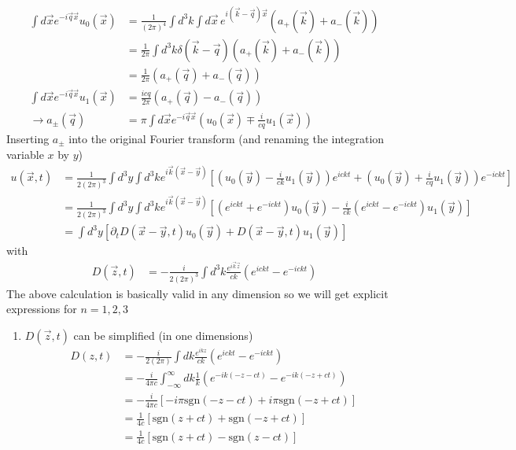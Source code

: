 \documentclass[../main.tex]{subfiles}
\begin{document}
\begin{itemize}
\begin{align}
\int d\vec{x}e^{-i\vec{q}\vec{x}}u_0(\vec{x})&=\frac{1}{(2\pi)^4}\int d^3k\int d\vec{x}\, e^{i(\vec{k}-\vec{q})\vec{x}}\left(a_+(\vec{k})+a_-(\vec{k})\right)\\
&=\frac{1}{2\pi}\int d^3k \delta(\vec{k}-\vec{q})\left(a_+(\vec{k})+a_-(\vec{k})\right)\\
&=\frac{1}{2\pi}\left(a_+(\vec{q})+a_-(\vec{q})\right)\\
\int d\vec{x}e^{-i\vec{q}\vec{x}}u_1(\vec{x})
&=\frac{icq}{2\pi}\left(a_+(\vec{q})-a_-(\vec{q})\right)\\
\rightarrow
a_\pm(\vec{q})&=\pi\int d\vec{x}e^{-i\vec{q}\vec{x}}\left(u_0(\vec{x})\mp\frac{i}{cq}u_1(\vec{x})\right)
\end{align}
Inserting $a_\pm$ into the original Fourier transform (and renaming the integration variable $x$ by $y$)
\begin{align}
u(\vec{x},t)
&=\frac{1}{2(2\pi)^3}\int d^3y\int d^3ke^{i\vec{k}(\vec{x}-\vec{y})} \left[\left(u_0(\vec{y})-\frac{i}{ck}u_1(\vec{y})\right)e^{ickt}+\left(u_0(\vec{y})+\frac{i}{cq}u_1(\vec{y})\right)e^{-ickt}\right]\\
&=\frac{1}{2(2\pi)^3}\int d^3y\int d^3ke^{i\vec{k}(\vec{x}-\vec{y})}\left[\left(e^{ickt}+e^{-ickt}\right) u_0(\vec{y})-\frac{i}{ck}\left(e^{ickt}-e^{-ickt}\right)u_1(\vec{y})\right]\\
&=\int d^3y\left[ \partial_t D(\vec{x}-\vec{y},t)u_0(\vec{y})+D(\vec{x}-\vec{y},t)u_1(\vec{y})\right]
\end{align}
with
\begin{align}
D(\vec{z},t)&=-\frac{i}{2(2\pi)^3}\int d^3k\frac{e^{i\vec{k}\vec{z}}}{ck}(e^{ickt}-e^{-ickt})
\end{align}
The above calculation is basically valid in any dimension so we will get explicit expressions for $n=1,2,3$
\begin{enumerate}
\item $D(\vec{z},t)$ can be simplified (in one dimensions)
\begin{align}
D(z,t)&=-\frac{i}{2(2\pi)}\int dk\frac{e^{ikz}}{ck}(e^{ickt}-e^{-ickt})\\
&=-\frac{i}{4\pi c}\int_{-\infty}^\infty dk\frac{1}{k}\left(e^{-ik(-z-ct)}-e^{-ik(-z+ct)}\right)\\
&=-\frac{i}{4\pi c}\left[-i\pi\text{sgn}(-z-ct)+i\pi\text{sgn}(-z+ct)\right]\\
&=\frac{1}{4 c}\left[\text{sgn}(z+ct)+\text{sgn}(-z+ct)\right]\\
&=\frac{1}{4 c}\left[\text{sgn}(z+ct)-\text{sgn}(z-ct)\right]\\

\end{align}
\end{enumerate}
\end{itemize}
\end{document}
